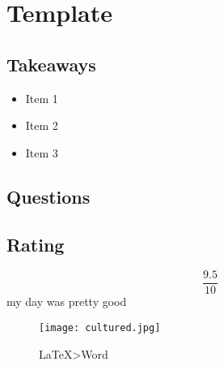 \documentclass[../main.tex]{subfiles}
\begin{document}
\section{Template}
\subsection{Takeaways}
\begin{itemize}
    \item Item 1
    \item Item 2
    \item Item 3
\end{itemize}
\subsection{Questions}
\begin{itemize}
\end{itemize}
\subsection{Rating}
\[\frac{9.5}{10}\]  my day was pretty good
\begin{figure}[bh]
    \centering
    \texttt{[image: cultured.jpg]}
    \caption{\LaTeX \textgreater Word}
    \label{img:foo}
\end{figure}
\end{document}
